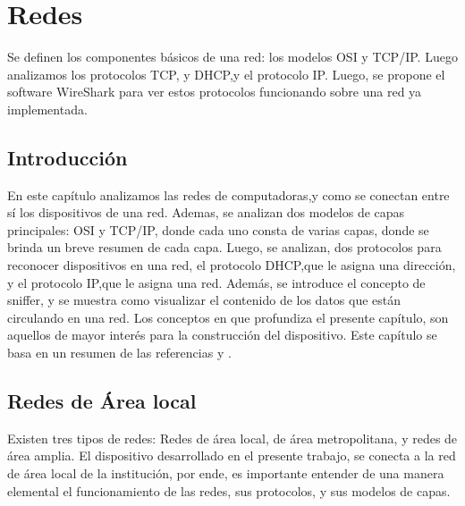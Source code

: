 \renewcommand{\chaptername}{Redes}  
\graphicspath{{parte_2/redes/}}
\chapter{Redes}
\markright{\chaptername }

\begin{center}
	\begin{tcolorbox}[colback=gray!5!white, %
		colframe=blue!75!black,
		title= \center{\Large{resumen}} ]
		Se definen los componentes básicos de una red: los modelos OSI y TCP/IP. Luego analizamos los protocolos TCP, y DHCP,y el protocolo IP. Luego, se propone el software WireShark para ver estos protocolos funcionando sobre una red ya implementada. 

	\end{tcolorbox}
\end{center}    
\section{Introducción} 
En este capítulo analizamos las redes de computadoras,y como se conectan entre sí los dispositivos de una red. Ademas, se analizan dos modelos de capas principales: OSI y TCP/IP, donde cada uno consta de varias capas, donde se brinda un breve resumen de cada capa. 
Luego, se analizan, dos protocolos para reconocer dispositivos en una red, el protocolo DHCP,que le asigna una dirección, y el protocolo IP,que le asigna una red. Además, se introduce el concepto de sniffer, y se muestra como visualizar el contenido de los datos que están circulando en una red. Los conceptos en que profundiza el presente capítulo, son aquellos de mayor interés para la construcción del dispositivo. Este capítulo se basa en un resumen de las referencias \cite{Stallings2004} y \cite{Tanenbaum2003}.  


\section{Redes de Área local }
Existen tres tipos de redes: Redes de área local, de área metropolitana, y redes de área amplia. El dispositivo desarrollado en el presente trabajo, se conecta a la red de área local de la institución, por ende, es importante entender de una manera elemental el funcionamiento de las redes, sus protocolos, y sus modelos de capas.   

